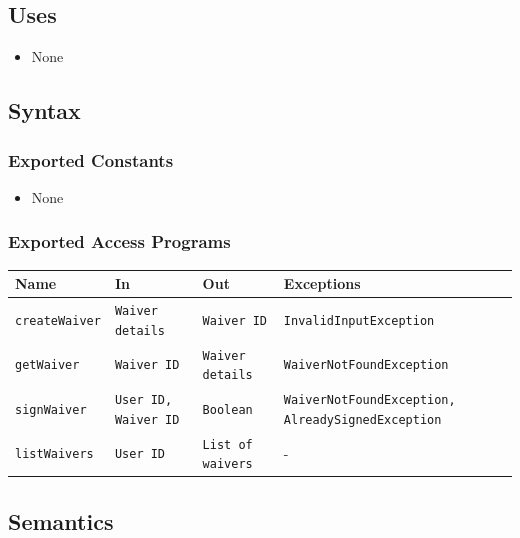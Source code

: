 \documentclass[12pt, titlepage]{article}
\begin{document}
\subsection{Uses}

\begin{itemize}
  \item None
\end{itemize}

\subsection{Syntax}

\subsubsection{Exported Constants}
\begin{itemize}
  \item None
\end{itemize}

\subsubsection{Exported Access Programs}
\begin{center}
  \begin{tabular}{p{3cm} p{4cm} p{4cm} p{5cm}}
    \toprule
    \textbf{Name}         & \textbf{In}                 & \textbf{Out}             & \textbf{Exceptions}                                      \\
    \midrule
    \texttt{createWaiver} & \texttt{Waiver details}     & \texttt{Waiver ID}       & \texttt{InvalidInputException}                           \\
    \texttt{getWaiver}    & \texttt{Waiver ID}          & \texttt{Waiver details}  & \texttt{WaiverNotFoundException}                         \\
    \texttt{signWaiver}   & \texttt{User ID, Waiver ID} & \texttt{Boolean}         & \texttt{WaiverNotFoundException, AlreadySignedException} \\
    \texttt{listWaivers}  & \texttt{User ID}            & \texttt{List of waivers} & -                                                        \\
    \bottomrule
  \end{tabular}
\end{center}


\subsection{Semantics}
\end{document}
